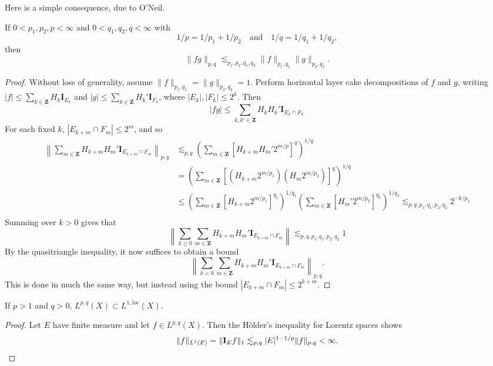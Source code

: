 Here is a simple consequence, due to O'Neil.

\begin{theorem}
    If $0 < p_1,p_2,p < \infty$ and $0 < q_1,q_2,q < \infty$ with
    \[ 1/p = 1/p_1 + 1/p_2 \quad \text{and} \quad 1/q = 1/q_1 + 1/q_2, \]
    then
    \[ \| f g \|_{p,q} \lesssim_{p_1,p_2,q_1,q_2} \| f \|_{p_1,q_1} \| g \|_{p_2,q_2}. \]
\end{theorem}
\begin{proof}
    Without loss of generality, assume $\| f \|_{p_1,q_1} = \| g \|_{p_2, q_2} = 1$. Perform horizontal layer cake decompositions of $f$ and $g$, writing $|f| \leq \sum_{k \in \mathbf{Z}} H_k \mathbf{I}_{E_k}$ and $|g| \leq \sum_{k \in \mathbf{Z}} H_k' \mathbf{I}_{F_k}$, where $|E_k|, |F_k| \leq 2^k$. Then
    \[ |fg| \leq \sum_{k,k' \in \mathbf{Z}} H_k H_k' \mathbf{I}_{E_k \cap F_{k'}} \]
    For each fixed $k$, $|E_{k + m} \cap F_m| \leq 2^m$, and so
    \begin{align*}
        \left\| \sum_{m \in \mathbf{Z}} H_{k + m} H_m' \mathbf{I}_{E_{k+m} \cap F_m} \right\|_{p,q} &\lesssim_{p,q} \left( \sum_{m \in \mathbf{Z}} [H_{k+m} H_m' 2^{m/p}]^q \right)^{1/q}\\
        &= \left( \sum_{m \in \mathbf{Z}} \left[ (H_{k+m} 2^{m/p_1}) (H_m 2^{m/p_2}) \right]^q \right)^{1/q}\\
        &\leq \left( \sum_{m \in \mathbf{Z}} [H_{k+m} 2^{m/p_1} ]^{q_1} \right)^{1/q_1} \left( \sum_{m \in \mathbf{Z}} [H_m' 2^{m/p_2}]^{q_2} \right)^{1/q_2} \lesssim_{p,q,p_1,q_1,p_2,q_2} 2^{-k/p_1}\\
    \end{align*}
    Summing over $k > 0$ gives that
    \[ \left\| \sum_{k \geq 0} \sum_{m \in \mathbf{Z}} H_{k+m} H_m' \mathbf{I}_{E_{k+m} \cap F_m} \right\| \lesssim_{p,q,p_1,q_1,p_2,q_2} 1 \]
    By the quasitriangle inequality, it now suffices to obtain a bound
    \[ \left\| \sum_{k < 0} \sum_{m \in \mathbf{Z}} H_{k+m} H_m' \mathbf{I}_{E_{k+m} \cap F_m} \right\|_{p,q}. \]
    This is done in much the same way, but instead using the bound $|E_{k+m} \cap F_m| \leq 2^{k+m}$.
\end{proof}

\begin{corollary}
    If $p > 1$ and $q > 0$, $L^{p,q}(X) \subset L^{1,\text{loc}}(X)$.
\end{corollary}
\begin{proof}
    Let $E$ have finite measure and let $f \in L^{p,q}(X)$. Then the H\"{o}lder's inequality for Lorentz spaces shows
    \[ \| f \|_{L^1(E)} = \| \mathbf{I}_E f \|_1 \lesssim_{p,q} |E|^{1 - 1/p} \| f \|_{p,q} < \infty. \qedhere \]
\end{proof}

